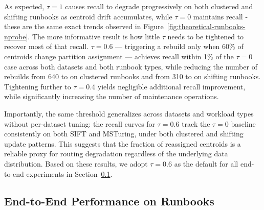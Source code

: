 \documentclass[sigconf,review,anonymous]{acmart}
\newcommand{\dk}[1]{\textcolor{teal}{(DK: #1)}}
\begin{document}
As expected, $\tau = 1$ causes recall to degrade progressively on both clustered and shifting runbooks as centroid drift accumulates, while $\tau = 0$ maintains recall - these are the same exact trends observed in Figure~\ref{fig:theoretical-runbooks-nprobe}. The more informative result is how little $\tau$ needs to be tightened to recover most of that recall. $\tau = 0.6$ — triggering a rebuild only when 60\% of centroids change partition assignment — achieves recall within 1\% of the $\tau=0$ case across both datasets and both runbook types, while reducing the number of rebuilds from 640 to  on clustered runbooks and from 310 to  on shifting runbooks. Tightening further to $\tau=0.4$ yields negligible additional recall improvement, while significantly increasing the number of maintenance operations.

Importantly, the same threshold generalizes across datasets and workload types without per-dataset tuning: the recall curves for $\tau=0.6$ track the $\tau=0$ baseline consistently on both SIFT and MSTuring, under both clustered and shifting update patterns. This suggests that the fraction of reassigned centroids is a reliable proxy for routing degradation regardless of the underlying data distribution. Based on these results, we adopt $\tau=0.6$ as the default for all end-to-end experiments in Section~\ref{sec:eval-perf}.

\subsection{End-to-End Performance on Runbooks}
\label{sec:eval-perf}

\end{document}

